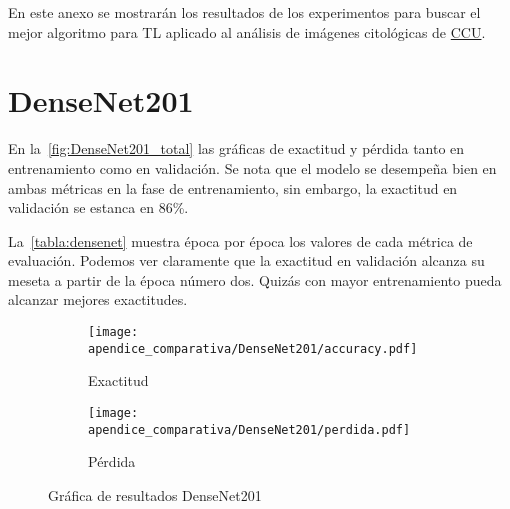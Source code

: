 En este anexo se mostrarán los resultados de los experimentos para buscar el
mejor algoritmo para TL aplicado al análisis de imágenes citológicas de  \hyperlink{abbr}{CCU}. 

\section{DenseNet201}
En la~\autoref{fig:DenseNet201_total} las gráficas de exactitud y pérdida tanto
en entrenamiento como en validación. Se nota que el modelo se desempeña bien en
ambas métricas en la fase de entrenamiento, sin embargo, la exactitud en
validación se estanca en 86\%.

La~\autoref{tabla:densenet} muestra época por época los valores de cada métrica
de evaluación. Podemos ver claramente que la exactitud en validación alcanza su
meseta a partir de la época número dos. Quizás con mayor entrenamiento pueda
alcanzar mejores exactitudes.

\begin{figure}[H]
    \centering
    \begin{subfigure}[b]{0.6\textwidth}
        \centering
       \texttt{[image: apendice\_comparativa/DenseNet201/accuracy.pdf]}
       \caption{Exactitud}\label{fig:accuracy_dense} 
    \end{subfigure}

    \begin{subfigure}[b]{0.6\textwidth}
        \centering
       \texttt{[image: apendice\_comparativa/DenseNet201/perdida.pdf]}
       \caption{Pérdida}\label{fig:perdida_dense}
    \end{subfigure}
    \caption{Gráfica de resultados DenseNet201}\label{fig:DenseNet201_total}
\end{figure}

